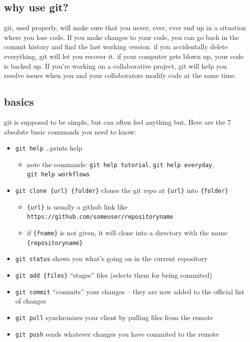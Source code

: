 \documentclass[
]{article}
\providecommand{\tightlist}{%
  \setlength{\itemsep}{0pt}\setlength{\parskip}{0pt}}
\begin{document}
\hypertarget{why-use-git}{%
\subsection{why use git?}\label{why-use-git}}

git, used properly, will make sure that you never, ever, ever end up in
a situation where you lose code. If you make changes to your code, you
can go back in the commit history and find the last working version. if
you accidentally delete everything, git will let you recover it. if your
computer gets blown up, your code is backed up. If you're working on a
collaborative project, git will help you resolve issues when you and
your collaborators modify code at the same time.

\hypertarget{basics}{%
\subsection{basics}\label{basics}}

git is supposed to be simple, but can often feel anything but. Here are
the 7 absolute basic commands you need to know:

\begin{itemize}
\tightlist
\item
  \texttt{git\ help} \ldots prints help

  \begin{itemize}
  \tightlist
  \item
    note the commands: \texttt{git\ help\ tutorial},
    \texttt{git\ help\ everyday}, \texttt{git\ help\ workflows}
  \end{itemize}
\item
  \texttt{git\ clone\ \{url\}\ \{folder\}} clones the git repo at
  \texttt{\{url\}} into \texttt{\{folder\}}

  \begin{itemize}
  \tightlist
  \item
    \texttt{\{url\}} is usually a github link like
    \texttt{https://github.com/someuser/repositoryname}
  \item
    if \texttt{\{fname\}} is not given, it will clone into a directory
    with the name \texttt{\{repositoryname\}}
  \end{itemize}
\item
  \texttt{git\ status} shows you what's going on in the current
  repository
\item
  \texttt{git\ add\ \{files\}} ``stages'' files (selects them for being
  commited)
\item
  \texttt{git\ commit} ``commits'' your changes -- they are now added to
  the official list of changes
\item
  \texttt{git\ pull} synchronizes your client by pulling files from the
  remote
\item
  \texttt{git\ push} sends whatever changes you have commited to the
  remote
\end{itemize}
\end{document}
